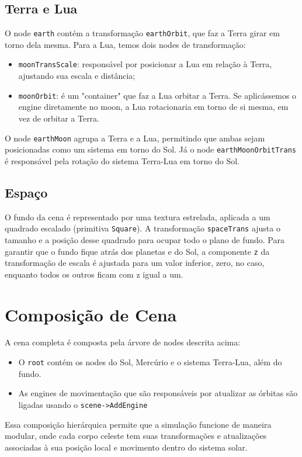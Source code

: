 \documentclass[11pt, a4paper]{article}
\begin{document}
\subsection{Terra e Lua}
O node \texttt{earth} contém a transformação \texttt{earthOrbit}, que faz a 
Terra girar em torno dela mesma. Para a Lua, temos dois nodes de transformação:

\begin{itemize}
\item \texttt{moonTransScale}: responsável por posicionar a Lua em relação à Terra, 
ajustando sua escala e distância;
\item \texttt{moonOrbit}: é um "container" que faz a Lua orbitar a Terra. Se
aplicássemos o engine diretamente no moon, a Lua rotacionaria em 
torno de si mesma, em vez de orbitar a Terra.
\end{itemize}

O node \texttt{earthMoon} agrupa a Terra e a Lua, permitindo que ambas sejam 
posicionadas como um sistema em torno do Sol. Já o node 
\texttt{earthMoonOrbitTrans} é responsável pela rotação do sistema Terra-Lua em 
torno do Sol.

\subsection{Espaço}
O fundo da cena é representado por uma textura estrelada, aplicada a um quadrado 
escalado (primitiva \texttt{Square}). A transformação \texttt{spaceTrans} ajusta 
o tamanho e a posição desse quadrado para ocupar todo o plano de fundo. Para 
garantir que o fundo fique atrás dos planetas e do Sol, a componente \texttt{z} 
da transformação de escala é ajustada para um valor inferior, zero, no caso,
enquanto todos os outros ficam com z igual a um.

\section {Composição de Cena}

A cena completa é composta pela árvore de nodes descrita acima:

\begin{itemize}
\item O \texttt{root} contém os nodes do Sol, Mercúrio e o sistema Terra-Lua, além 
do fundo.
\item As engines de movimentação que são responsáveis por atualizar as órbitas 
são ligadas usando o \texttt{scene->AddEngine}
\end{itemize}

Essa composição hierárquica permite que a simulação funcione de maneira modular, 
onde cada corpo celeste tem suas transformações e atualizações associadas à sua 
posição local e movimento dentro do sistema solar.
\end{document}
